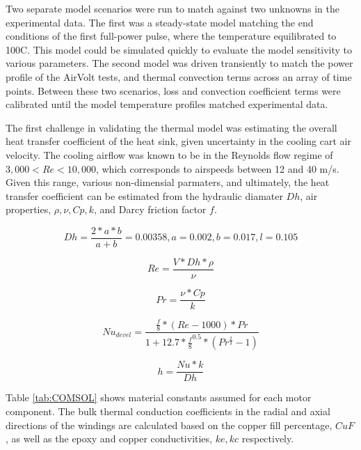 \documentclass[]{aiaa-tc}%
\begin{document}
Two separate model scenarios were run to match against two unknowns in the experimental data. The first was a steady-state model matching the end conditions of the first full-power pulse, where the temperature equilibrated to 100\degree C. This model could be simulated quickly to evaluate the model sensitivity to various parameters. The second model was driven transiently to match the power profile of the AirVolt tests, and thermal convection terms across an array of time points. Between these two scenarios, loss and convection coefficient terms were calibrated until the model temperature profiles matched experimental data.

The first challenge in validating the thermal model was estimating the overall heat transfer coefficient of the heat sink, given uncertainty in the cooling cart air velocity. The cooling airflow was known to be in the Reynolds flow regime of $3,000<Re<10,000$, which corresponds to airspeeds between 12 and 40 m/s. Given this range, various non-dimensial parmaters, and ultimately, the heat transfer coefficient can be estimated from the hydraulic diamater $Dh$, air properties, $\rho, \nu, Cp, k$, and Darcy friction factor $f$.

\begin{equation}
Dh = \frac{2*a*b}{a+b} = 0.00358,
a = 0.002, b = 0.017, l = 0.105
\label{eq:Dh}
\end{equation}

\begin{equation}
Re = \frac{V*Dh*\rho}{\nu}
\label{eq:Re}
\end{equation}

\begin{equation}
Pr = \frac{\nu*Cp}{k}
\label{eq:Pr}
\end{equation}

\begin{equation}
Nu_{devel} = \frac{\frac{f}{8}*(Re-1000)*Pr}{1+12.7*\frac{f}{8}^{0.5}*(Pr^{\frac{2}{3}}-1)}
\label{eq:Nu}
\end{equation}

\begin{equation}
h = \frac{Nu*k}{Dh}
\label{eq:h}
\end{equation}

Table \ref{tab:COMSOL} shows material constants assumed for each motor component. The bulk thermal conduction coefficients in the radial and axial directions of the windings are calculated based on the copper fill percentage, $CuF$, as well as the epoxy and copper conductivities, $ke, kc$ respectively.
\end{document}
